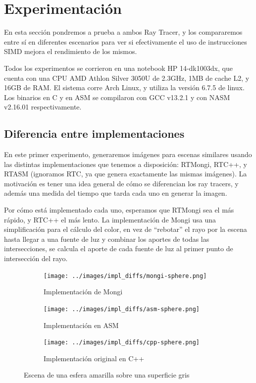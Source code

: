 \section{Experimentación} \label{sec:experimentacion}

En esta sección pondremos a prueba a ambos Ray Tracer, y los compararemos entre
sí en diferentes escenarios para ver si efectivamente el uso de instrucciones
SIMD mejora el rendimiento de los mismos.

Todos los experimentos se corrieron en una notebook HP 14-dk1003dx, que cuenta
con una CPU AMD Athlon Silver 3050U de 2.3GHz, 1MB de cache L2, y 16GB de RAM.
El sistema corre Arch Linux, y utiliza la versión 6.7.5 de linux. Los binarios
en C y en ASM se compilaron con GCC v13.2.1 y con NASM v2.16.01 respectivamente.

\subsection{Diferencia entre implementaciones}

En este primer experimento, generaremos imágenes para escenas similares usando
las distintas implementaciones que tenemos a disposición: RTMongi, RTC++, y
RTASM (ignoramos RTC, ya que genera exactamente las mismas imágenes). La
motivación es tener una idea general de cómo se diferencian los ray tracers, y
además una medida del tiempo que tarda cada uno en generar la imagen.

Por cómo está implementado cada uno, esperamos que RTMongi sea el más rápido, y
RTC++ el más lento. La implementación de Mongi usa una simplificación para el
cálculo del color, en vez de ``rebotar'' el rayo por la escena hasta llegar a
una fuente de luz y combinar los aportes de todas las intersecciones, se calcula
el aporte de cada fuente de luz al primer punto de intersección del rayo.

\begin{figure}[H]
  \centering
  \begin{subfigure}[b]{0.45\textwidth}
    \centering
    \texttt{[image: ../images/impl\_diffs/mongi-sphere.png]}
    \caption{Implementación de Mongi}
    \label{fig:yellow-sphere-mongi}
  \end{subfigure}
  \hfill
  \begin{subfigure}[b]{0.45\textwidth}
    \centering
    \texttt{[image: ../images/impl\_diffs/asm-sphere.png]}
    \caption{Implementación en ASM}
    \label{fig:yellow-sphere-asm}
  \end{subfigure}
  \hfill
  \begin{subfigure}[b]{0.45\textwidth}
    \centering
    \texttt{[image: ../images/impl\_diffs/cpp-sphere.png]}
    \caption{Implementación original en C++}
    \label{fig:yellow-sphere-cpp}
  \end{subfigure}

  \caption{Escena de una esfera amarilla sobre una superficie gris}
  \label{fig:yellow-sphere}
\end{figure}

